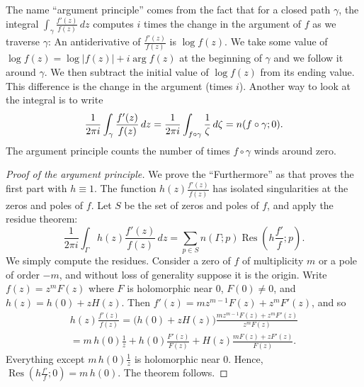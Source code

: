 \documentclass[12pt,openany]{book}
\newcommand{\avoidbreak}{\postdisplaypenalty=100}
\newcommand{\sabs}[1]{\lvert {#1} \rvert}
\newcommand{\myquote}[1]{``#1''}
\theoremstyle{plain}
\theoremstyle{remark}
\theoremstyle{definition}
\theoremstyle{exercise}
\theoremstyle{example}
\begin{document}
The name \myquote{argument principle} comes from the fact that for a closed path
$\gamma$,
the integral
$\int_{\gamma} \frac{f'(z)}{f(z)} \, dz$
computes $i$ times the change in the argument of $f$ as we traverse $\gamma$:
An antiderivative of
$\frac{f'(z)}{f(z)}$
is $\log f(z)$.
We take some value of $\log f(z) = \log \sabs{f(z)} + i \arg f(z)$
at the beginning of $\gamma$ and we follow it
around $\gamma$.
We then subtract the initial value of $\log f(z)$ from its ending value.
This difference is the change in the argument (times $i$).
Another way to look at the integral is to write
\begin{equation*}
\frac{1}{2\pi i}
\int_{\gamma} \frac{f'(z)}{f(z)} \, dz = 
\frac{1}{2\pi i}
\int_{f \circ \gamma} \frac{1}{\zeta} \, d\zeta 
=
n(f \circ \gamma ; 0 )
.
\avoidbreak
\end{equation*}
The
argument principle counts the number of times 
$f \circ \gamma$ winds around zero.

\begin{proof}[Proof of the argument principle]
We prove the \myquote{Furthermore} as that proves the first part
with $h \equiv 1$.
The function $h(z) \frac{f'(z)}{f(z)}$ has isolated singularities
at the zeros and poles of $f$.  Let $S$ be the set of zeros and poles of $f$,
and apply the residue theorem:
\begin{equation*}
\frac{1}{2\pi i}
\int_\Gamma h(z) \frac{f'(z)}{f(z)} \, dz
=
\sum_{p \in S} n(\Gamma;p)\operatorname{Res}\left(h \frac{f'}{f};p\right) .
\end{equation*}
We simply compute the residues.
Consider a zero of $f$ of multiplicity $m$ or a pole of order $-m$, and
without loss of generality suppose it is the origin.
Write $f(z)  = z^m F(z)$ where $F$ is holomorphic near $0$,
$F(0) \neq 0$,
and $h(z) = h(0) + z H(z)$.
Then $f'(z) = m z^{m-1} F(z) + z^m F'(z)$, and so
\begin{multline*}
h(z) \frac{f'(z)}{f(z)}
=
\bigl( h(0) + z H(z) \bigr)
\frac{m z^{m-1} F(z) + z^m F'(z)}{z^m F(z)}
\\
=
m\, h(0) 
\frac{1}{z}
+
h(0) 
\frac{F'(z)}{F(z)}
+
H(z)
\frac{m F(z) + z F'(z)}{F(z)} .
\end{multline*}
Everything except $m\, h(0) \frac{1}{z}$ is holomorphic near $0$.
Hence, $\operatorname{Res}\left(h\frac{f'}{f};0\right) = m\, h(0)$.
The theorem follows.
\end{proof}
\end{document}
